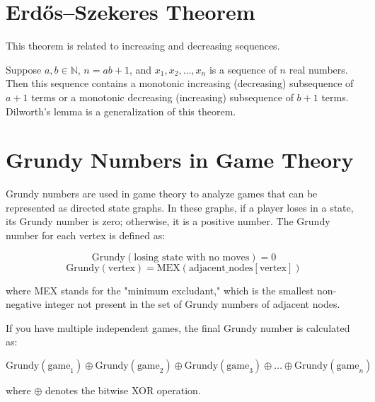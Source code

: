 \section*{Erdős–Szekeres Theorem}
This theorem is related to increasing and decreasing sequences.

Suppose \( a, b \in \mathbb{N} \), \( n = ab + 1 \), and \( x_1, x_2, \dots, x_n \) is a sequence of \( n \) real numbers. Then this sequence contains a monotonic increasing (decreasing) subsequence of \( a + 1 \) terms or a monotonic decreasing (increasing) subsequence of \( b + 1 \) terms. Dilworth's lemma is a generalization of this theorem.

\section*{Grundy Numbers in Game Theory}
Grundy numbers are used in game theory to analyze games that can be represented as directed state graphs. In these graphs, if a player loses in a state, its Grundy number is zero; otherwise, it is a positive number. The Grundy number for each vertex is defined as:

\[
\text{Grundy}(\text{losing state with no moves}) = 0
\]
\[
\text{Grundy}(\text{vertex}) = \text{MEX}(\text{adjacent\_nodes}[\text{vertex}])
\]

where MEX stands for the "minimum excludant," which is the smallest non-negative integer not present in the set of Grundy numbers of adjacent nodes.

If you have multiple independent games, the final Grundy number is calculated as:

\[
\text{Grundy}(\text{game}_1) \oplus \text{Grundy}(\text{game}_2) \oplus \text{Grundy}(\text{game}_3) \oplus \dots \oplus \text{Grundy}(\text{game}_n)
\]

where \( \oplus \) denotes the bitwise XOR operation.
